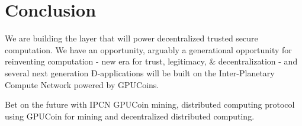\documentclass{article}
\begin{document}
\section{Conclusion}
We are building the layer that will power decentralized trusted secure computation. We have an opportunity, arguably a generational opportunity for reinventing computation - new era for trust, legitimacy, \& decentralization - and several next generation Ð-applications will be built on the Inter-Planetary Compute Network powered by GPUCoins.


Bet on the future with IPCN GPUCoin mining, distributed computing protocol using GPUCoin for mining and decentralized distributed computing.





\newpage
\listoffigures
\newpage 
\listoftables
\newpage 

\end{document}
